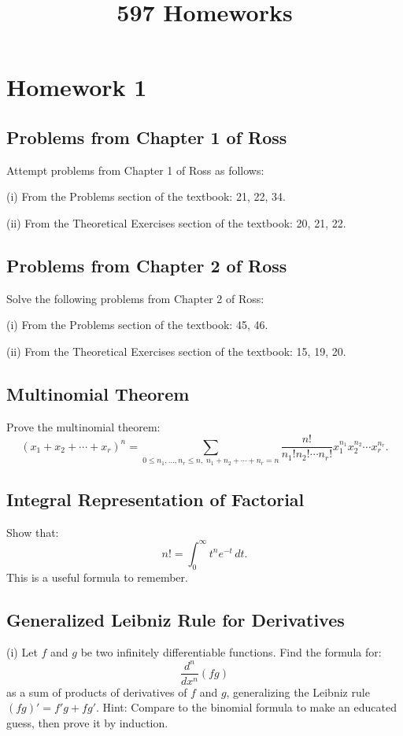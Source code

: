 \documentclass[lang=cn,11pt]{elegantbook}
\title{597 Homeworks}
\begin{document}
\frontmatter
\tableofcontents
\mainmatter



\chapter{Homework 1}

\section{Problems from Chapter 1 of Ross}
Attempt problems from Chapter 1 of Ross as follows:

(i) From the Problems section of the textbook: 21, 22, 34.

(ii) From the Theoretical Exercises section of the textbook: 20, 21, 22.

\section{Problems from Chapter 2 of Ross}
Solve the following problems from Chapter 2 of Ross:

(i) From the Problems section of the textbook: 45, 46.

(ii) From the Theoretical Exercises section of the textbook: 15, 19, 20.

\section{Multinomial Theorem}
Prove the multinomial theorem:
\[
(x_1 + x_2 + \cdots + x_r)^n = \sum_{0 \leq n_1, \ldots, n_r \leq n, \; n_1+n_2+\cdots+n_r=n} \frac{n!}{n_1! n_2! \cdots n_r!} x_1^{n_1} x_2^{n_2} \cdots x_r^{n_r}.
\]

\section{Integral Representation of Factorial}
Show that:
\[
n! = \int_0^\infty t^n e^{-t} \, dt.
\]
This is a useful formula to remember.

\section{Generalized Leibniz Rule for Derivatives}
(i) Let $f$ and $g$ be two infinitely differentiable functions. Find the formula for:
\[
\frac{d^n}{dx^n}(fg)
\]
as a sum of products of derivatives of $f$ and $g$, generalizing the Leibniz rule \((fg)' = f'g + fg'\). Hint: Compare to the binomial formula to make an educated guess, then prove it by induction.
\end{document}
